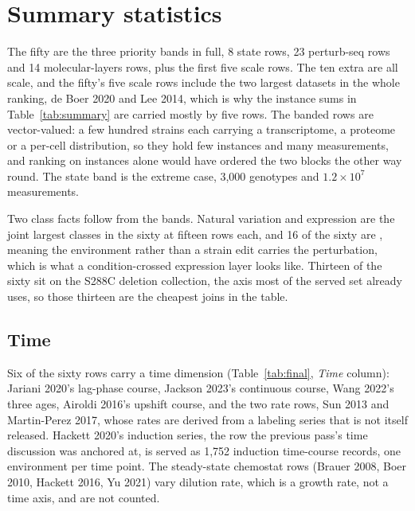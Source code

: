 
\clearpage
\section{Summary statistics}\label{sec:summary}



The fifty are the three priority bands in full, 8 state rows, 23 perturb-seq rows and 14
molecular-layers rows, plus the first five scale rows. The ten extra are all scale, and
the fifty's five scale rows include the two largest datasets in the whole ranking, de Boer
2020 and Lee 2014, which is why the instance sums in Table~\ref{tab:summary} are carried
mostly by five rows. The banded rows are vector-valued: a few hundred strains each carrying
a transcriptome, a proteome or a per-cell distribution, so they hold few instances and many
measurements, and ranking on instances alone would have ordered the two blocks the other
way round. The state band is the extreme case, 3,000 genotypes and $1.2\times10^7$
measurements.

Two class facts follow from the bands. Natural variation and expression are the joint
largest classes in the sixty at fifteen rows each, and 16 of the sixty are
, meaning the environment rather than a strain edit carries the
perturbation, which is what a condition-crossed expression layer looks like. Thirteen of
the sixty sit on the S288C deletion collection, the axis most of the served set already
uses, so those thirteen are the cheapest joins in the table.

\subsection{Time}\label{sec:time}

Six of the sixty rows carry a time dimension (Table~\ref{tab:final}, \emph{Time} column):
Jariani 2020's lag-phase course, Jackson 2023's continuous course, Wang 2022's three ages,
Airoldi 2016's upshift course, and the two rate rows, Sun 2013 and Martin-Perez 2017,
whose rates are derived from a labeling series that is not itself released. Hackett 2020's
induction series, the row the previous pass's time discussion was anchored at, is served
as 1,752 induction time-course records, one environment per time point. The steady-state
chemostat rows (Brauer 2008, Boer 2010, Hackett 2016, Yu 2021) vary dilution rate, which
is a growth rate, not a time axis, and are not counted.

